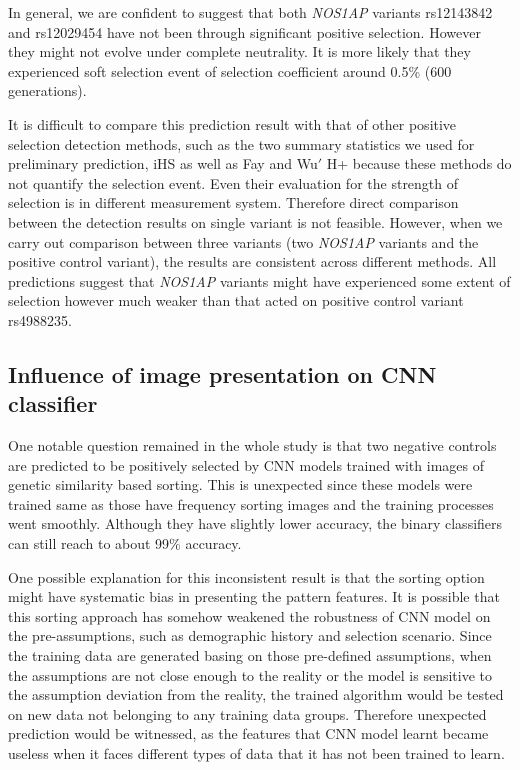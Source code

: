 \documentclass[a4paper,12pt,oneside]{extarticle}
\begin{document}
\par
In general, we are confident to suggest that both \textit{NOS1AP} variants rs12143842 and rs12029454 have not been through significant positive selection. However they might not evolve under complete neutrality. It is more likely that they experienced soft selection event of selection coefficient around 0.5\% (600 generations).  
\par
It is difficult to compare this prediction result with that of other positive selection detection methods, such as the two summary statistics we used for preliminary prediction, iHS as well as Fay and Wu$'$ H+ because these methods do not quantify the selection event. Even their evaluation for the strength of selection is in different measurement system. Therefore direct comparison between the detection results on single variant is not feasible. However, when we carry out comparison between three variants (two \textit{NOS1AP} variants and the positive control variant), the results are consistent across different methods. All predictions suggest that \textit{NOS1AP} variants might have experienced some extent of selection however much weaker than that acted on positive control variant rs4988235.

\subsection{Influence of image presentation on CNN classifier}
\par
One notable question remained in the whole study is that two negative controls are predicted to be positively selected by CNN models trained with images of genetic similarity based sorting. This is unexpected since these models were trained same as those have frequency sorting images and the training processes went smoothly. Although they have slightly lower accuracy, the binary classifiers can still reach to about 99\% accuracy.
\par
One possible explanation for this inconsistent result is that the sorting option might have systematic bias in presenting the pattern features. It is possible that this sorting approach has somehow weakened the robustness of CNN model on the pre-assumptions, such as demographic history and selection scenario. Since the training data are generated basing on those pre-defined assumptions, when the assumptions are not close enough to the reality or the model is sensitive to the assumption deviation from the reality, the trained algorithm would be tested on new data not belonging to any training data groups. Therefore unexpected prediction would be witnessed, as the features that CNN model learnt became useless when it faces different types of data that it has not been trained to learn. 
\end{document}
